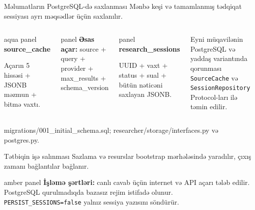 \documentclass[aspectratio=169,11pt]{beamer}
\newenvironment{panel}{\begin{beamercolorbox}[wd=\linewidth,sep=1.2ex,rounded=true]{panel}}{\end{beamercolorbox}}
\newenvironment{aquapanel}{\begin{beamercolorbox}[wd=\linewidth,sep=1.2ex,rounded=true]{aqua panel}}{\end{beamercolorbox}}
\newenvironment{amberpanel}{\begin{beamercolorbox}[wd=\linewidth,sep=1.2ex,rounded=true]{amber panel}}{\end{beamercolorbox}}
\newcommand{\lead}[1]{{\color{muted}\normalsize #1}\par\vspace{0.75em}}
\newcommand{\tinyref}[1]{{\color{muted}\scriptsize #1}}
\newcommand{\speaker}{ii1ahe}
\begin{document}
\renewcommand{\speaker}{fatimekazimli}
\begin{frame}[fragile]{Məlumatların PostgreSQL-də saxlanması}
  \lead{Mənbə keşi və tamamlanmış tədqiqat sessiyası ayrı məqsədlər üçün saxlanılır.}
  \begin{columns}[T,onlytextwidth]
      \begin{aquapanel}
        \textbf{source\_cache}\par
        \small Açarın 5 hissəsi + JSONB məzmun + bitmə vaxtı.
      \end{aquapanel}
      \vspace{2mm}
      \begin{panel}
        \scriptsize \textbf{Əsas açar:} source + query + provider + max\_results + schema\_version
      \end{panel}
      \begin{panel}
        \textbf{research\_sessions}\par
        \small UUID + vaxt + status + sual + bütün nəticəni saxlayan JSONB.
      \end{panel}
      \vspace{2mm}
      \small Eyni müqavilənin PostgreSQL və yaddaş variantında qorunması \texttt{SourceCache} və \texttt{SessionRepository} Protocol-ları ilə təmin edilir.
  \end{columns}
  \vspace{2mm}
  \tinyref{migrations/001\_initial\_schema.sql; researcher/storage/interfaces.py və postgres.py.}
\end{frame}

\begin{frame}{Tətbiqin işə salınması}
  \lead{Sazlama və resurslar bootstrap mərhələsində yaradılır, çıxış zamanı bağlantılar bağlanır.}
  \begin{center}
  \end{center}
  \vspace{-1mm}
  \begin{amberpanel}
    \small \textbf{İşləmə şərtləri:} canlı cavab üçün internet və API açarı tələb edilir. PostgreSQL qurulmadıqda bazasız rejim istifadə olunur. \texttt{PERSIST\_SESSIONS=false} yalnız sessiya yazısını söndürür.
  \end{amberpanel}
\end{frame}
\end{document}
